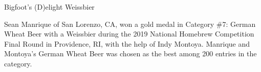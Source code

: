 \stylesection{\styleweizenweissbier}

\begin{recipie}{Bigfoot's (D)elight Weissbier}

\begin{aboutblock}
Sean Manrique of San Lorenzo, CA, won a gold medal in Category \#7: German Wheat
Beer with a Weissbier during the 2019 National Homebrew Competition Final Round
in Providence, RI, with the help of Indy Montoya. Manrique and Montoya's German
Wheat Beer was chosen as the best among 200 entries in the category.
\sourceaha
\end{aboutblock}


\begin{methodandtiming}
 
\begin{mashsteps}
\end{mashsteps}

\begin{fermentationsteps}
\end{fermentationsteps}

\end{methodandtiming}

\pagebreak

\begin{ingredientsblock}

\begin{malts}
\end{malts}

\begin{hops}
\end{hops}


\end{ingredientsblock}

\end{recipie}

